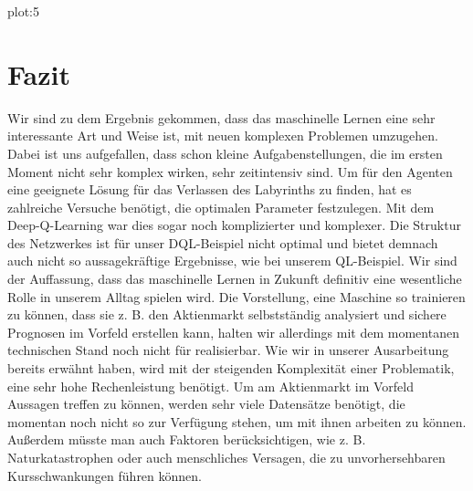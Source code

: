 \documentclass[12pt,titlepage]{article}
\begin{document}
plot:5

\section{Fazit}
Wir sind zu dem Ergebnis gekommen, dass das maschinelle Lernen eine sehr interessante Art und Weise ist, mit neuen komplexen Problemen umzugehen. Dabei ist uns aufgefallen, dass schon kleine Aufgabenstellungen, die im ersten Moment nicht sehr komplex wirken, sehr zeitintensiv sind. Um für den Agenten eine geeignete Lösung für das Verlassen des Labyrinths zu finden, hat es zahlreiche Versuche benötigt, die optimalen Parameter festzulegen. Mit dem Deep-Q-Learning war dies sogar noch komplizierter und komplexer. Die Struktur des Netzwerkes ist für unser DQL-Beispiel nicht optimal und bietet demnach auch nicht so aussagekräftige Ergebnisse, wie bei unserem QL-Beispiel.
Wir sind der Auffassung, dass das maschinelle Lernen in Zukunft definitiv eine wesentliche Rolle in unserem Alltag spielen wird. Die Vorstellung, eine Maschine so trainieren zu können, dass sie z. B. den Aktienmarkt selbstständig analysiert und sichere Prognosen im Vorfeld erstellen kann, halten wir allerdings mit dem momentanen technischen Stand noch nicht für realisierbar. Wie wir in unserer Ausarbeitung bereits erwähnt haben, wird mit der steigenden Komplexität einer Problematik, eine sehr hohe Rechenleistung benötigt. Um am Aktienmarkt im Vorfeld Aussagen treffen zu können, werden sehr viele Datensätze benötigt, die momentan noch nicht so zur Verfügung stehen, um mit ihnen arbeiten zu können. Außerdem müsste man auch Faktoren berücksichtigen, wie z. B. Naturkatastrophen oder auch menschliches Versagen, die zu unvorhersehbaren Kursschwankungen führen können. 
\end{document}
